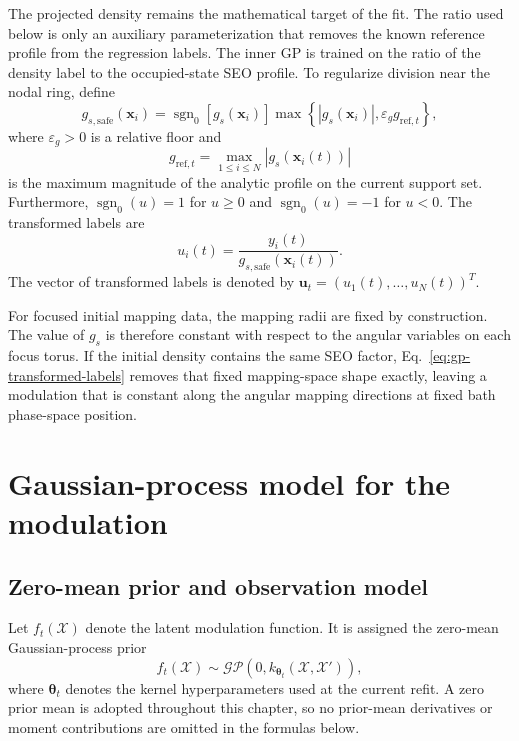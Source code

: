 \documentclass[
  11pt,
  letterpaper,
  onehalfspacing,
  normalmargins,
  equalmargins,
  oneside
]{ut-thesis}
\begin{document}
The projected density remains the mathematical target of the fit. The ratio used
below is only an auxiliary parameterization that removes the known reference
profile from the regression labels. The inner GP is trained on the ratio of
the density label to the occupied-state SEO profile. To regularize division
near the nodal ring, define
\begin{equation}
 g_{s,\mathrm{safe}}(\mathbf x_i)
=
\operatorname{sgn}_0\!\left[g_s(\mathbf x_i)\right]
\max\left
\{
\left|g_s(\mathbf x_i)\right|,
\varepsilon_g g_{\mathrm{ref},t}
\right\},
\label{eq:seo-safe-profile}
\end{equation}
where \(\varepsilon_g>0\) is a relative floor and
\begin{equation}
g_{\mathrm{ref},t}
=
\max_{1\leq i\leq N}
\left|
g_s\!\left(\mathbf x_i(t)\right)
\right|
\label{eq:seo-reference-profile-scale}
\end{equation}
is the maximum magnitude of the analytic profile on the current support set.
Furthermore,
\(\operatorname{sgn}_0(u)=1\) for \(u\geq0\) and
\(\operatorname{sgn}_0(u)=-1\) for \(u<0\). The transformed labels are
\begin{equation}
 u_i(t)
=
\frac{y_i(t)}{g_{s,\mathrm{safe}}(\mathbf x_i(t))}.
\label{eq:gp-transformed-labels}
\end{equation}
The vector of transformed labels is denoted by
\(\mathbf u_t=(u_1(t),\ldots,u_N(t))^T\).

For focused initial mapping data, the mapping radii are fixed by construction.
The value of \(g_s\) is therefore constant with respect to the angular
variables on each focus torus. If the initial density contains the same SEO
factor, Eq.~\eqref{eq:gp-transformed-labels} removes that fixed mapping-space
shape exactly, leaving a modulation that is constant along the angular
mapping directions at fixed bath phase-space position.


\section{Gaussian-process model for the modulation}
\label{sec:gp-regression-density}

\subsection{Zero-mean prior and observation model}
\label{subsec:gp-prior-density-functions}

Let \(f_t(\boldsymbol{\mathcal X})\) denote the latent modulation function.
It is assigned the zero-mean Gaussian-process prior
\begin{equation}
f_t(\boldsymbol{\mathcal X})
\sim
\mathcal{GP}\!\left(
0,
 k_{\boldsymbol\theta_t}
\left(
\boldsymbol{\mathcal X},
\boldsymbol{\mathcal X}'
\right)
\right),
\label{eq:gp-modulation-prior}
\end{equation}
where \(\boldsymbol\theta_t\) denotes the kernel hyperparameters used at the
current refit. A zero prior mean is adopted throughout this chapter, so no
prior-mean derivatives or moment contributions are omitted in the formulas
below.
\end{document}
